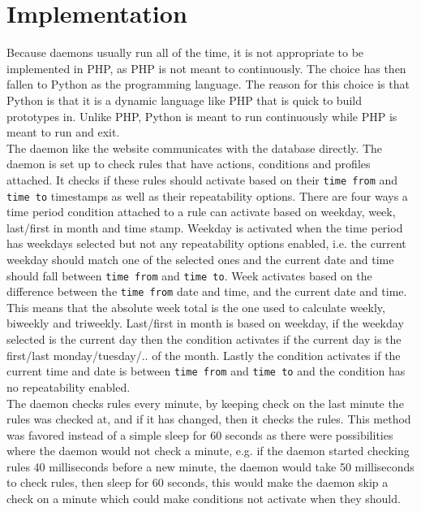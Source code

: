 \section{Implementation}
Because daemons usually run all of the time, it is not appropriate to be implemented in PHP, as PHP is not meant to continuously. The choice has then fallen to Python as the programming language. The reason for this choice is that Python is that it is a dynamic language like PHP that is quick to build prototypes in. Unlike PHP, Python is meant to run continuously while PHP is meant to run and exit. \\
The daemon like the website communicates with the database directly. The daemon is set up to check rules that have actions, conditions and profiles attached. It checks if these rules should activate based on their \texttt{time from} and \texttt{time to} timestamps as well as their repeatability options. There are four ways a time period condition attached to a rule can activate based on weekday, week, last/first in month and time stamp. Weekday is activated when the time period has weekdays selected but not any repeatability options enabled, i.e. the current weekday should match one of the selected ones and the current date and time should fall between \texttt{time from} and \texttt{time to}. Week activates based on the difference between the \texttt{time from} date and time, and the current date and time. This means that the absolute week total is the one used to calculate weekly, biweekly and triweekly. Last/first in month is based on weekday, if the weekday selected is the current day then the condition activates if the current day is the first/last monday/tuesday/.. of the month. Lastly the condition activates if the current time and date is between \texttt{time from} and \texttt{time to} and the condition has no repeatability enabled. \\
The daemon checks rules every minute, by keeping check on the last minute the rules was checked at, and if it has changed, then it checks the rules. This method was favored instead of a simple sleep for 60 seconds as there were possibilities where the daemon would not check a minute, e.g. if the daemon started checking rules 40 milliseconds before a new minute, the daemon would take 50 milliseconds to check rules, then sleep for 60 seconds, this would make the daemon skip a check on a minute which could make conditions not activate when they should.